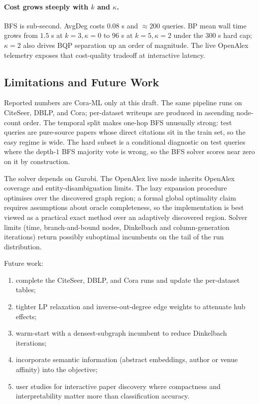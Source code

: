 \documentclass[11pt]{article}
\begin{document}
\paragraph{Cost grows steeply with $k$ and $\kappa$.}
BFS is sub-second. AvgDeg costs $0.08$ s and $\approx 200$ queries. BP
mean wall time grows from $1.5$ s at $k = 3, \kappa = 0$ to $96$ s at
$k = 5, \kappa = 2$ under the $300$ s hard cap; $\kappa = 2$ also drives
BQP separation up an order of magnitude. The live OpenAlex telemetry
exposes that cost-quality tradeoff at interactive latency.

\subsection{Limitations and Future Work}

Reported numbers are Cora-ML only at this draft. The same pipeline runs
on CiteSeer, DBLP, and Cora; per-dataset writeups are produced in
ascending node-count order. The temporal split makes one-hop BFS
unusually strong: test queries are pure-source papers whose direct
citations sit in the train set, so the easy regime is wide. The hard
subset is a conditional diagnostic on test queries where the depth-$1$
BFS majority vote is wrong, so the BFS solver scores near zero on it by
construction.

The solver depends on Gurobi. The OpenAlex live mode inherits OpenAlex
coverage and entity-disambiguation limits. The lazy expansion procedure
optimises over the discovered graph region; a formal global optimality
claim requires assumptions about oracle completeness, so the
implementation is best viewed as a practical exact method over an
adaptively discovered region. Solver limits (time, branch-and-bound
nodes, Dinkelbach and column-generation iterations) return possibly
suboptimal incumbents on the tail of the run distribution.

Future work:
\begin{enumerate}[leftmargin=1.2cm]
  \item complete the CiteSeer, DBLP, and Cora runs and update the
  per-dataset tables;
  \item tighter LP relaxation and inverse-out-degree edge weights to
  attenuate hub effects;
  \item warm-start with a densest-subgraph incumbent to reduce
  Dinkelbach iterations;
  \item incorporate semantic information (abstract embeddings, author or
  venue affinity) into the objective;
  \item user studies for interactive paper discovery where compactness
  and interpretability matter more than classification accuracy.
\end{enumerate}
\end{document}

